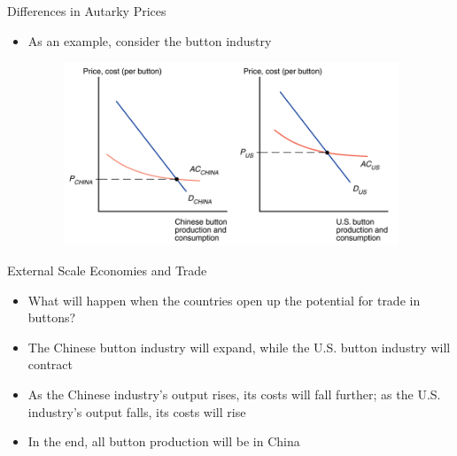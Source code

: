 \documentclass[10pt,hyperref={CJKbookmarks=true},xcolor=dvipsnames,aspectratio=169]{beamer}
\begin{document}
\begin{frame}{Differences in Autarky Prices }

\begin{itemize}
\item As an example, consider the button industry
\begin{figure}
\centering{}\includegraphics[width=10cm]{fig/krugman/lec6-7}
\end{figure}

\end{itemize}
\end{frame}

\begin{frame}{External Scale Economies and Trade}

\begin{itemize}
\item What will happen when the countries open up the potential for trade
in buttons? 
\item The Chinese button industry will expand, while the U.S. button industry
will contract 
\item As the Chinese industry’s output rises, its costs will fall further;
as the U.S. industry’s output falls, its costs will rise 
\item In the end, all button production will be in China 
\end{itemize}
\end{frame}
\end{document}
